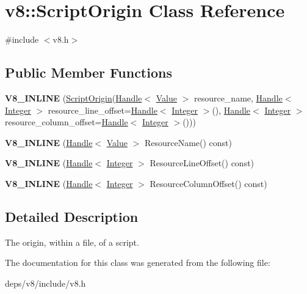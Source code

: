 \hypertarget{classv8_1_1_script_origin}{}\section{v8\+:\+:Script\+Origin Class Reference}
\label{classv8_1_1_script_origin}


{\ttfamily \#include $<$v8.\+h$>$}

\subsection*{Public Member Functions}
\begin{DoxyCompactItemize}
\item 
\hypertarget{classv8_1_1_script_origin_a91c6223f2730889baf1cc604f411dbb4}{}{\bfseries V8\+\_\+\+I\+N\+L\+I\+N\+E} (\hyperlink{classv8_1_1_script_origin}{Script\+Origin}(\hyperlink{classv8_1_1_handle}{Handle}$<$ \hyperlink{classv8_1_1_value}{Value} $>$ resource\+\_\+name, \hyperlink{classv8_1_1_handle}{Handle}$<$ \hyperlink{classv8_1_1_integer}{Integer} $>$ resource\+\_\+line\+\_\+offset=\hyperlink{classv8_1_1_handle}{Handle}$<$ \hyperlink{classv8_1_1_integer}{Integer} $>$(), \hyperlink{classv8_1_1_handle}{Handle}$<$ \hyperlink{classv8_1_1_integer}{Integer} $>$ resource\+\_\+column\+\_\+offset=\hyperlink{classv8_1_1_handle}{Handle}$<$ \hyperlink{classv8_1_1_integer}{Integer} $>$()))\label{classv8_1_1_script_origin_a91c6223f2730889baf1cc604f411dbb4}

\item 
\hypertarget{classv8_1_1_script_origin_a3b1475462546cdc12e19125367d6918c}{}{\bfseries V8\+\_\+\+I\+N\+L\+I\+N\+E} (\hyperlink{classv8_1_1_handle}{Handle}$<$ \hyperlink{classv8_1_1_value}{Value} $>$ Resource\+Name() const)\label{classv8_1_1_script_origin_a3b1475462546cdc12e19125367d6918c}

\item 
\hypertarget{classv8_1_1_script_origin_a90e3924ade98ad9a55fde84bfa38bda0}{}{\bfseries V8\+\_\+\+I\+N\+L\+I\+N\+E} (\hyperlink{classv8_1_1_handle}{Handle}$<$ \hyperlink{classv8_1_1_integer}{Integer} $>$ Resource\+Line\+Offset() const)\label{classv8_1_1_script_origin_a90e3924ade98ad9a55fde84bfa38bda0}

\item 
\hypertarget{classv8_1_1_script_origin_a33954a98de843936b2a540ef48960486}{}{\bfseries V8\+\_\+\+I\+N\+L\+I\+N\+E} (\hyperlink{classv8_1_1_handle}{Handle}$<$ \hyperlink{classv8_1_1_integer}{Integer} $>$ Resource\+Column\+Offset() const)\label{classv8_1_1_script_origin_a33954a98de843936b2a540ef48960486}

\end{DoxyCompactItemize}


\subsection{Detailed Description}
The origin, within a file, of a script. 

The documentation for this class was generated from the following file\+:\begin{DoxyCompactItemize}
\item 
deps/v8/include/v8.\+h\end{DoxyCompactItemize}
